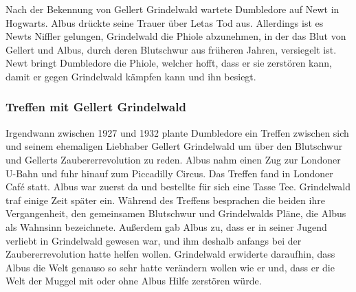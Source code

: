 \documentclass[a4paper, 10pt]{article}
\begin{document}
\vspace{10pt}
\newline
{}  
Nach der Bekennung von Gellert Grindelwald wartete Dumbledore auf Newt in Hogwarts. Albus drückte seine Trauer über Letas Tod aus. Allerdings ist es Newts Niffler gelungen, Grindelwald die Phiole abzunehmen, in der das Blut von Gellert und Albus, durch deren Blutschwur aus früheren Jahren, versiegelt ist. Newt bringt Dumbledore die Phiole, welcher hofft, dass er sie zerstören kann, damit er gegen Grindelwald kämpfen kann und ihn besiegt.

\subsubsection*{Treffen mit Gellert Grindelwald}
Irgendwann zwischen 1927 und 1932 plante Dumbledore ein Treffen zwischen sich und seinem ehemaligen Liebhaber Gellert Grindelwald um über den Blutschwur und Gellerts Zaubererrevolution zu reden. Albus nahm einen Zug zur Londoner U-Bahn und fuhr hinauf zum Piccadilly Circus. Das Treffen fand in Londoner Café statt. Albus war zuerst da und bestellte für sich eine Tasse Tee. Grindelwald traf einige Zeit später ein. Während des Treffens besprachen die beiden ihre Vergangenheit, den gemeinsamen Blutschwur und Grindelwalds Pläne, die Albus als Wahnsinn bezeichnete. Außerdem gab Albus zu, dass er in seiner Jugend verliebt in Grindelwald gewesen war, und ihm deshalb anfangs bei der Zaubererrevolution hatte helfen wollen. Grindelwald erwiderte daraufhin, dass Albus die Welt genauso so sehr hatte verändern wollen wie er und, dass er die Welt der Muggel mit oder ohne Albus Hilfe zerstören würde.
\end{document}
